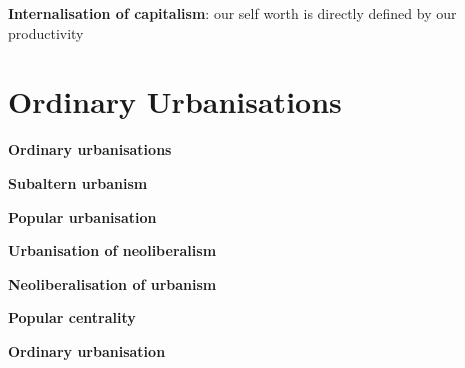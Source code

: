 \documentclass{article}
\begin{document}
\textbf{Internalisation of capitalism}: our self worth is directly defined by our productivity

\section{Ordinary Urbanisations}

\textbf{Ordinary urbanisations}

\textbf{Subaltern urbanism}

\textbf{Popular urbanisation}

\textbf{Urbanisation of neoliberalism}

\textbf{Neoliberalisation of urbanism}

\textbf{Popular centrality}

\textbf{Ordinary urbanisation}


\textbf{}


\textbf{}
\end{document}
